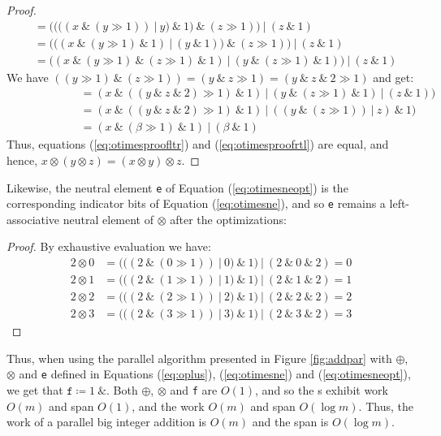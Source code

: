 \begin{proof}
\begin{align}
               &= ((((x~\&~(y \gg 1))~|~y)~\&~1)~\&~(z \gg 1))~|~(z~\&~1) \\
               &= (((x~\&~(y \gg 1)~\&~1)~|~(y~\&~1))~\&~(z \gg 1))~|~(z~\&~1) \\
               &= ((x~\&~(y \gg 1)~\&~(z \gg 1)~\&~1)~|~(y~\&~(z \gg 1)~\&~1))~|~(z~\&~1)
\end{align}
We have $((y \gg 1)~\&~(z \gg 1)) = (y~\&~z \gg 1) = (y~\&~z~\&~2 \gg 1)$ and get:
\begin{align}
  &= (x~\&~((y~\&~z~\&~2) \gg 1)~\&~1)~|~(y~\&~(z \gg 1)~\&~1)~|~(z~\&~1))\\
  \phantom{((\alpha~\&~1)\&}&= (x~\&~((y~\&~z~\&~2) \gg 1)~\&~1)~|~((y~\&~(z \gg 1))~|~z)~\&~1)\\
  &= (x~\&~(\beta \gg 1)~\&~1)~|~(\beta~\&~1)
\end{align}
Thus, equations (\ref{eq:otimesproofltr}) and (\ref{eq:otimesproofrtl}) are equal, and hence, $x \otimes (y \otimes z) = (x \otimes y) \otimes z$.
\end{proof}

Likewise, the neutral element \texttt{e} of Equation (\ref{eq:otimesneopt}) is
the corresponding indicator bits of Equation (\ref{eq:otimesne}), and so
\texttt{e} remains a left-associative neutral element of $\otimes$ after the
optimizations:

\begin{proof} By exhaustive evaluation we have:
\begin{align}
  \label{eq:otimesneproof}
  2 \otimes 0 &= (((2~\&~(0 \gg 1))~|~0)~\&~1)~|~(2~\&~0~\&~2) = 0 \\
  2 \otimes 1 &= (((2~\&~(1 \gg 1))~|~1)~\&~1)~|~(2~\&~1~\&~2) = 1 \\
  2 \otimes 2 &= (((2~\&~(2 \gg 1))~|~2)~\&~1)~|~(2~\&~2~\&~2) = 2 \\
  2 \otimes 3 &= (((2~\&~(3 \gg 1))~|~3)~\&~1)~|~(2~\&~3~\&~2) = 3
\end{align}
\end{proof}

Thus, when using the parallel algorithm presented in Figure \ref{fig:addpar}
with $\oplus$, $\otimes$ and \texttt{e} defined in Equations (\ref{eq:oplus}),
(\ref{eq:otimesne}) and (\ref{eq:otimesneopt}), we get that
$\mathtt{f} \coloneq 1~\&$. Both $\oplus$, $\otimes$ and \texttt{f} are $O(1)$, and so the
s exhibit work $O(m)$ and span $O(1)$, and the  work $O(m)$
and span $O(\log m)$. Thus, the work of a parallel big integer addition is
$O(m)$ and the span is $O(\log m)$.


